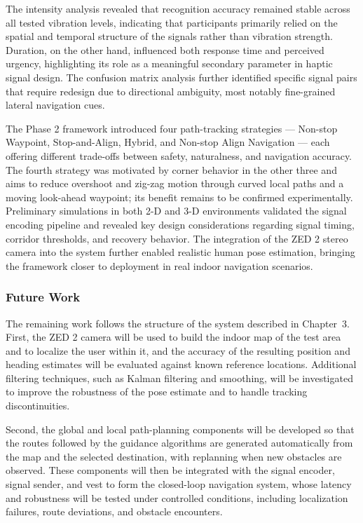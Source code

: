 \documentclass[12pt]{report}
\begin{document}
The intensity analysis revealed that recognition accuracy remained stable across all tested vibration levels, indicating that participants primarily relied on the spatial and temporal structure of the signals rather than vibration strength. Duration, on the other hand, influenced both response time and perceived urgency, highlighting its role as a meaningful secondary parameter in haptic signal design. The confusion matrix analysis further identified specific signal pairs that require redesign due to directional ambiguity, most notably fine-grained lateral navigation cues.

The Phase 2 framework introduced four path-tracking strategies --- Non-stop Waypoint, Stop-and-Align, Hybrid, and Non-stop Align Navigation --- each offering different trade-offs between safety, naturalness, and navigation accuracy. The fourth strategy was motivated by corner behavior in the other three and aims to reduce overshoot and zig-zag motion through curved local paths and a moving look-ahead waypoint; its benefit remains to be confirmed experimentally. Preliminary simulations in both 2-D and 3-D environments validated the signal encoding pipeline and revealed key design considerations regarding signal timing, corridor thresholds, and recovery behavior. The integration of the ZED 2 stereo camera into the system further enabled realistic human pose estimation, bringing the framework closer to deployment in real indoor navigation scenarios.

\subsubsection{Future Work}

The remaining work follows the structure of the system described in Chapter~3. First, the ZED 2 camera will be used to build the indoor map of the test area and to localize the user within it, and the accuracy of the resulting position and heading estimates will be evaluated against known reference locations. Additional filtering techniques, such as Kalman filtering and smoothing, will be investigated to improve the robustness of the pose estimate and to handle tracking discontinuities.

Second, the global and local path-planning components will be developed so that the routes followed by the guidance algorithms are generated automatically from the map and the selected destination, with replanning when new obstacles are observed. These components will then be integrated with the signal encoder, signal sender, and vest to form the closed-loop navigation system, whose latency and robustness will be tested under controlled conditions, including localization failures, route deviations, and obstacle encounters.
\end{document}
